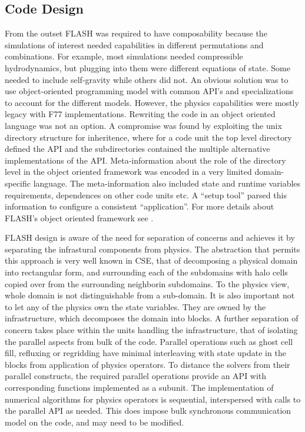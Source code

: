

\subsection{Code Design}
From the outset FLASH was required to have composability because the
simulations of interest needed capabilities in different permutations
and combinations. For example, most simulations needed compressible
hydrodynamics, but plugging into them were different equations of
state. Some needed to include self-gravity while others did not. An
obvious solution was to use object-oriented programming model with
common API's and specializations to account for the different
models. However, the physics capabilities were mostly legacy with F77
implementations. Rewriting the code in an object oriented language was
not an option. A compromise was found by exploiting the unix directory
structure for inheritence, where for a code unit the top level
directory defined the API and the subdirectories contained the
multiple alternative implementations of the API. Meta-information
about the role of the directory level in the object oriented framework
was encoded in a very limited domain-specific language. The
meta-information also included state and runtime variables
requirements, dependences on other code units etc. A ``setup tool''
parsed this information to configure a consistent ``application''. 
For more details about FLASH's object oriented framework
see \cite{Dubey2009, Fryxell2000}.  

FLASH design is aware of the need for separation of concerns and
achieves it by separating the infrastural components
from physics. The abstraction that permits this approach is very
well known in CSE, that of decomposing a physical domain into
rectangular form, and surrounding each of the subdomains with halo
cells copied over from the surrounding neighborin subdomains. To the
physics view, whole domain is not distinguishable from a sub-domain. 
It is also important not to let any of the  physics own the state
variables. They are owned by the infrastructure, which 
decomposes the domain into blocks. A further separation of concern
takes place within the units handling the infrastructure, that of
isolating the parallel aspects from bulk of the code. Parallel
operations such as ghost cell fill, refluxing or regridding have
minimal interleaving with state update in the blocks from application
of physics operators. To distance the solvers from their parallel
constructs, the required parallel operations provide an API with
corresponding functions implemented as a subunit. The implementation
of numerical algorithms for physics operators is sequential,
interspersed with calls to the parallel API as needed. This does
impose bulk synchronous communication model on the code, and may need
to be modified.


